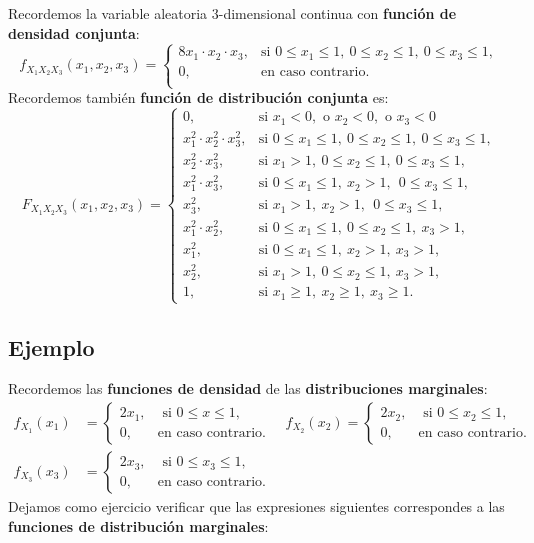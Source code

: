 \documentclass[]{book}
\begin{document}
Recordemos la variable aleatoria \(3\)-dimensional continua con \textbf{función de densidad conjunta}:
\[
f_{X_1X_2X_3}(x_1,x_2,x_3)=\begin{cases}
8 x_1\cdot x_2\cdot x_3, & \mbox{si }0\leq x_1\leq 1,\ 0\leq x_2\leq 1,\ 0\leq x_3\leq 1, \\
0, & \mbox{en caso contrario.}\\
\end{cases}
\]
Recordemos también \textbf{función de distribución conjunta} es:
\[
F_{X_1X_2X_3}(x_1,x_2,x_3)=\begin{cases}
0, & \mbox{si }x_1<0,\mbox{ o }x_2<0,\mbox{ o }x_3 <0\\
x_1^2\cdot x_2^2\cdot x_3^2, & \mbox{si }0\leq x_1\leq 1,\ 0\leq x_2\leq 1,\ 0\leq x_3\leq 1, \\
 x_2^2\cdot x_3^2, & \mbox{si }x_1> 1,\ 0\leq x_2\leq  1,\ 0\leq x_3\leq  1, \\
 x_1^2\cdot x_3^2, & \mbox{si }0\leq x_1\leq  1,\ x_2> 1,\ \ 0\leq x_3\leq  1, \\
 x_3^2, & \mbox{si }x_1> 1,\ x_2> 1,\ \ 0\leq x_3\leq  1, \\
 x_1^2\cdot x_2^2, & \mbox{si }0\leq x_1\leq  1,\ 0\leq x_2\leq  1,\ x_3> 1,\\
 x_1^2, & \mbox{si }0\leq x_1\leq  1,\ x_2 >  1,\ x_3> 1,\\
 x_2^2, & \mbox{si }x_1>1,\ 0\leq x_2\leq  1,\ x_3> 1,\\
1, & \mbox{si }x_1\geq 1,\ x_2\geq 1,\ x_3\geq 1.
\end{cases}
\]

\hypertarget{ejemplo-124}{%
\subsection{Ejemplo}\label{ejemplo-124}}

Recordemos las \textbf{funciones de densidad} de las \textbf{distribuciones marginales}:
\[
\begin{array}{rl}
f_{X_1}(x_1) & =\begin{cases}
2x_1, & \mbox{ si }0\leq x\leq 1,\\
0, & \mbox{en caso contrario.}
\end{cases}\quad f_{X_2}(x_2)=\begin{cases}
2x_2, & \mbox{ si }0\leq x_2\leq 1,\\
0, & \mbox{en caso contrario.}
\end{cases}\\ f_{X_3}(x_3) & =\begin{cases}
2x_3, & \mbox{ si }0\leq x_3\leq 1,\\
0, & \mbox{en caso contrario.}
\end{cases}
\end{array}
\]
Dejamos como ejercicio verificar que las expresiones siguientes correspondes a las \textbf{funciones de distribución marginales}:
\end{document}
